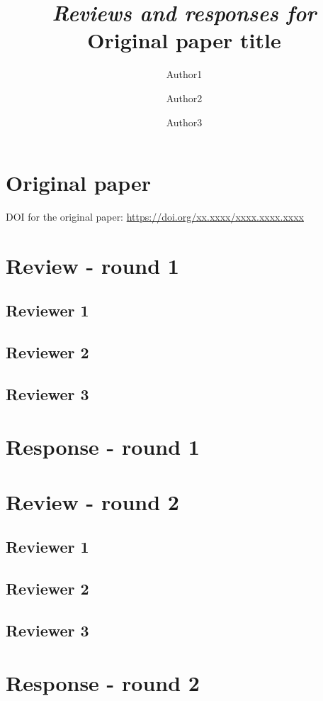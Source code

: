 \documentclass[
  manuscript=editorial,  %
  layout=publish,  %
  year=2023,
  volume=1,
]{extra/review}
\title{\emph{Reviews and responses for}\\\vspace*{0.5em}
Original paper title
}
\author{Author1}
\author{Author2}
\author{Author3}
\begin{document}
\section{Original paper}

DOI for the original paper: \url{https://doi.org/xx.xxxx/xxxx.xxxx.xxxx}


\section{Review - round 1}

\subsection{Reviewer 1}
\subsection{Reviewer 2}
\subsection{Reviewer 3}

\section{Response - round 1}



\section{Review - round 2}

\subsection{Reviewer 1}
\subsection{Reviewer 2}
\subsection{Reviewer 3}

\section{Response - round 2}
\end{document}
